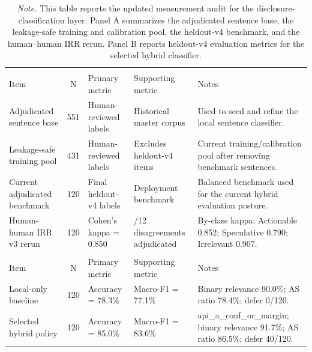 \begin{table}[!htbp]
\centering
\small
\caption{Measurement audit of the disclosure-classification layer}
\label{tab:appendix_audit}
\begin{tabular}{>{\raggedright\arraybackslash}p{2.8cm}c>{\raggedright\arraybackslash}p{2.8cm}>{\raggedright\arraybackslash}p{2.8cm}>{\raggedright\arraybackslash}p{5.4cm}}
\hline
\multicolumn{5}{l}{\textit{Panel A. Human labeling and validation}} \\
Item & N & Primary metric & Supporting metric & Notes \\
Adjudicated sentence base & 551 & Human-reviewed labels & Historical master corpus & Used to seed and refine the local sentence classifier. \\
Leakage-safe training pool & 431 & Human-reviewed labels & Excludes heldout-v4 items & Current training/calibration pool after removing benchmark sentences. \\
Current adjudicated benchmark & 120 & Final heldout-v4 labels & Deployment benchmark & Balanced benchmark used for the current hybrid evaluation posture. \\
Human-human IRR v3 rerun & 120 & Cohen's kappa = 0.850 & 12/12 disagreements adjudicated & By-class kappa: Actionable 0.852; Speculative 0.790; Irrelevant 0.907. \\
\multicolumn{5}{l}{\textit{Panel B. Heldout-v4 model evaluation}} \\
Item & N & Primary metric & Supporting metric & Notes \\
Local-only baseline & 120 & Accuracy = 78.3\% & Macro-F1 = 77.1\% & Binary relevance 90.0\%; AS ratio 78.4\%; defer 0/120. \\
Selected hybrid policy & 120 & Accuracy = 85.0\% & Macro-F1 = 83.6\% & api\_a\_conf\_or\_margin; binary relevance 91.7\%; AS ratio 86.5\%; defer 40/120. \\
\hline
\end{tabular}
\caption*{\footnotesize \textit{Note.} This table reports the updated measurement audit for the disclosure-classification layer. Panel A summarizes the adjudicated sentence base, the leakage-safe training and calibration pool, the heldout-v4 benchmark, and the human--human IRR rerun. Panel B reports heldout-v4 evaluation metrics for the selected hybrid classifier.}
\end{table}
